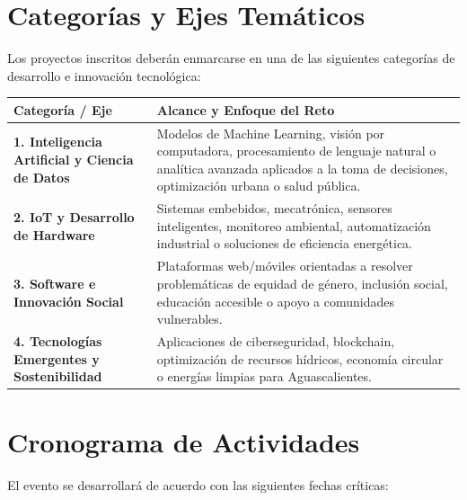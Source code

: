 \documentclass[11pt,letterpaper]{article}
\begin{document}
\section{Categorías y Ejes Temáticos}

Los proyectos inscritos deberán enmarcarse en una de las siguientes categorías de desarrollo e innovación tecnológica:

\begin{center}
\begin{tabularx}{\textwidth}{@{}p{4.2cm} X@{}}
\toprule
\textbf{Categoría / Eje} & \textbf{Alcance y Enfoque del Reto} \\
\midrule
\textbf{1. Inteligencia Artificial y Ciencia de Datos} & Modelos de Machine Learning, visión por computadora, procesamiento de lenguaje natural o analítica avanzada aplicados a la toma de decisiones, optimización urbana o salud pública. \\
\midrule
\textbf{2. IoT y Desarrollo de Hardware} & Sistemas embebidos, mecatrónica, sensores inteligentes, monitoreo ambiental, automatización industrial o soluciones de eficiencia energética. \\
\midrule
\textbf{3. Software e Innovación Social} & Plataformas web/móviles orientadas a resolver problemáticas de equidad de género, inclusión social, educación accesible o apoyo a comunidades vulnerables. \\
\midrule
\textbf{4. Tecnologías Emergentes y Sostenibilidad} & Aplicaciones de ciberseguridad, blockchain, optimización de recursos hídricos, economía circular o energías limpias para Aguascalientes. \\
\bottomrule
\end{tabularx}
\end{center}

\section{Cronograma de Actividades}

El evento se desarrollará de acuerdo con las siguientes fechas críticas:
\end{document}
